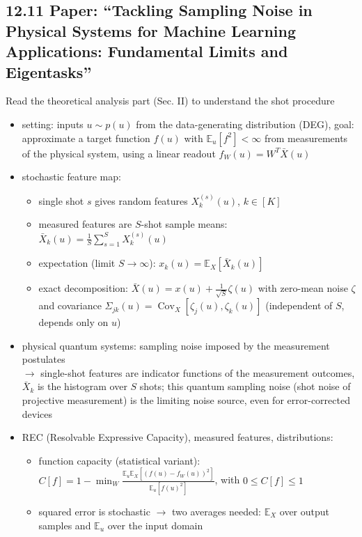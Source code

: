 \subsection*{12.11 \quad Paper: ``Tackling Sampling Noise in Physical Systems for Machine Learning Applications: Fundamental Limits and Eigentasks''}
Read the theoretical analysis part (Sec. II) to understand the shot procedure
\begin{itemize}
    \item setting: inputs $u \sim p(u)$ from the data-generating distribution (DEG), goal: approximate a target function $f(u)$ with $\mathbb{E}_u[f^2] < \infty$ from measurements of the physical system, using a linear readout $f_W(u) = W^T \bar{X}(u)$
    \item stochastic feature map:
    \begin{itemize}
        \item single shot $s$ gives random features $X_k^{(s)}(u)$, $k \in [K]$
        \item measured features are $S$-shot sample means: $\bar{X}_k(u) = \frac{1}{S}\sum_{s=1}^{S} X_k^{(s)}(u)$
        \item expectation (limit $S \to \infty$): $x_k(u) = \mathbb{E}_X[\bar{X}_k(u)]$
        \item exact decomposition: $\bar{X}(u) = x(u) + \frac{1}{\sqrt{S}}\zeta(u)$ with zero-mean noise $\zeta$ and covariance $\Sigma_{jk}(u) = \operatorname{Cov}_X[\zeta_j(u), \zeta_k(u)]$ (independent of $S$, depends only on $u$)
    \end{itemize}
    \item physical quantum systems: sampling noise imposed by the measurement postulates \\
    $\to$ single-shot features are indicator functions of the measurement outcomes, $\bar{X}_k$ is the histogram over $S$ shots; this quantum sampling noise (shot noise of projective measurement) is the limiting noise source, even for error-corrected devices
    \item REC (Resolvable Expressive Capacity), measured features, distributions:
    \begin{itemize}
        \item function capacity (statistical variant): $C[f] = 1 - \min_{W} \frac{\mathbb{E}_u \mathbb{E}_X[(f(u) - f_W(u))^2]}{\mathbb{E}_u[f(u)^2]}$, with $0 \le C[f] \le 1$
        \item squared error is stochastic $\to$ two averages needed: $\mathbb{E}_X$ over output samples and $\mathbb{E}_u$ over the input domain

\end{itemize}
\end{itemize}
